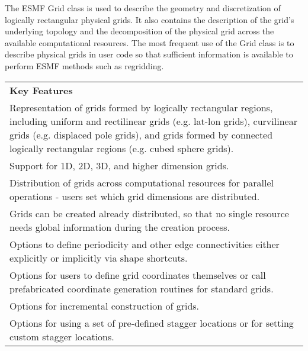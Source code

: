 %

The ESMF Grid class is used to describe the geometry and discretization
of logically rectangular physical grids.  It also contains the
description of the grid's underlying topology and the decomposition
of the physical grid across the available computational resources.
The most frequent use of the Grid class is to describe physical grids
in user code so that sufficient information is available to perform ESMF
methods such as regridding.  

\begin{center}
\begin{tabular}{|p{6in}|}
\hline
\vspace{.01in}
{\bf Key Features} \\[.01in]
Representation of grids formed by logically rectangular regions,
including uniform and rectilinear grids (e.g. lat-lon grids),
curvilinear grids (e.g. displaced pole grids), and grids formed
by connected logically rectangular regions (e.g. cubed sphere grids).\\
Support for 1D, 2D, 3D, and higher dimension grids.\\ 
Distribution of grids across computational resources for parallel
operations - users set which grid dimensions are distributed.\\
Grids can be created already distributed, so that no single
resource needs global information during the creation process.\\
Options to define periodicity and other edge connectivities either 
explicitly or implicitly via shape shortcuts.\\ 
Options for users to define grid coordinates themselves or call
prefabricated coordinate generation routines for standard grids.\\
Options for incremental construction of grids.\\
Options for using a set of pre-defined stagger locations or for setting
custom stagger locations.\\ [.03in] \hline
\end{tabular}
\end{center}


